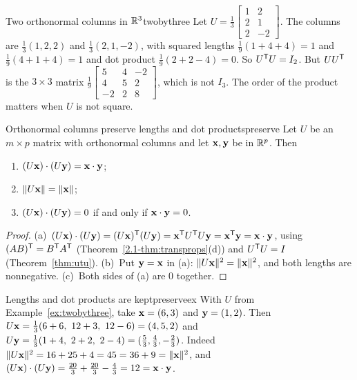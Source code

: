 \documentclass[11pt]{article}
\begin{document}
\begin{exmp}{Two orthonormal columns in $\mathbb{R}^3$}{twobythree}
Let $U=\tfrac13\begin{bmatrix}1&2\\2&1\\2&-2\end{bmatrix}$. The columns are $\tfrac13(1,2,2)$ and $\tfrac13(2,1,-2)$, with squared lengths $\tfrac19(1+4+4)=1$ and $\tfrac19(4+1+4)=1$ and dot product $\tfrac19(2+2-4)=0$. So $U^{\mathsf T} U=I_2$. But $UU^{\mathsf T}$ is the $3\times3$ matrix $\tfrac19\begin{bmatrix}5&4&-2\\4&5&2\\-2&2&8\end{bmatrix}$, which is not $I_3$. The order of the product matters when $U$ is not square.
\end{exmp}

\begin{thm}{Orthonormal columns preserve lengths and dot products}{preserve}
Let $U$ be an $m\times p$ matrix with orthonormal columns and let $\mathbf{x},\mathbf{y}$ be in $\mathbb{R}^p$. Then
\begin{enumerate}[label=(\alph*),itemsep=1pt]
  \item $(U\mathbf{x})\cdot(U\mathbf{y})=\mathbf{x}\cdot\mathbf{y}$;
  \item $\lVert U\mathbf{x}\rVert=\lVert\mathbf{x}\rVert$;
  \item $(U\mathbf{x})\cdot(U\mathbf{y})=0$ if and only if $\mathbf{x}\cdot\mathbf{y}=0$.
\end{enumerate}
\end{thm}

\begin{proof}
(a)~$(U\mathbf{x})\cdot(U\mathbf{y})=(U\mathbf{x})^{\mathsf T}(U\mathbf{y})=\mathbf{x}^{\mathsf T} U^{\mathsf T} U\mathbf{y}=\mathbf{x}^{\mathsf T}\mathbf{y}=\mathbf{x}\cdot\mathbf{y}$, using $(AB)^{\mathsf T}=B^{\mathsf T} A^{\mathsf T}$ (Theorem~\ref{2.1-thm:transprops}(d)) and $U^{\mathsf T} U=I$ (Theorem~\ref{thm:utu}). (b)~Put $\mathbf{y}=\mathbf{x}$ in (a): $\lVert U\mathbf{x}\rVert^2=\lVert\mathbf{x}\rVert^2$, and both lengths are nonnegative. (c)~Both sides of (a) are $0$ together.
\end{proof}

\begin{exmp}{Lengths and dot products are kept}{preserveex}
With $U$ from Example~\ref{ex:twobythree}, take $\mathbf{x}=(6,3)$ and $\mathbf{y}=(1,2)$. Then $U\mathbf{x}=\tfrac13(6+6,\ 12+3,\ 12-6)=(4,5,2)$ and $U\bv{y}=\tfrac13(1+4,\ 2+2,\ 2-4)=(\tfrac53,\tfrac43,-\tfrac23)$. Indeed $\lVert U\mathbf{x}\rVert^2=16+25+4=45=36+9=\lVert\mathbf{x}\rVert^2$, and $(U\mathbf{x})\cdot(U\mathbf{y})=\tfrac{20}{3}+\tfrac{20}{3}-\tfrac43=12=\mathbf{x}\cdot\mathbf{y}$.
\end{exmp}
\end{document}
